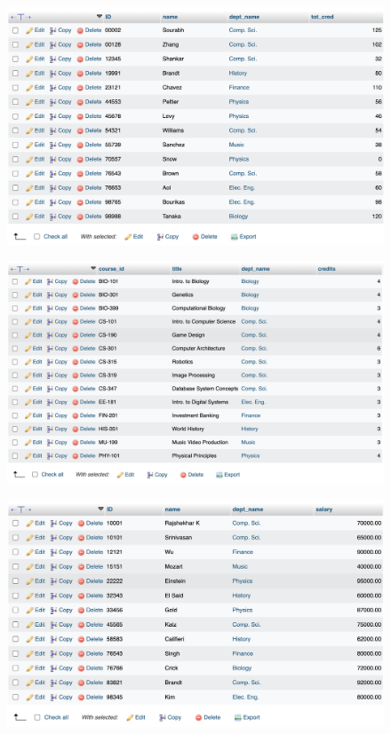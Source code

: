 \documentclass[12pt]{article}
\begin{document}
\begin{figure}[!hbt]
    \centering
    \includegraphics[scale=0.55]{screenshots/7 3 student.png}
    \label{fig:my_label1}
\end{figure}

\newpage

\begin{figure}[!hbt]
    \centering
    \includegraphics[scale=0.5]{screenshots/7 3 course.png}
    \label{fig:my_label1}
\end{figure}

\begin{figure}[!hbt]
    \centering
    \includegraphics[scale=0.55]{screenshots/7 3 instructor.png}
    \label{fig:my_label1}
\end{figure}
\end{document}
